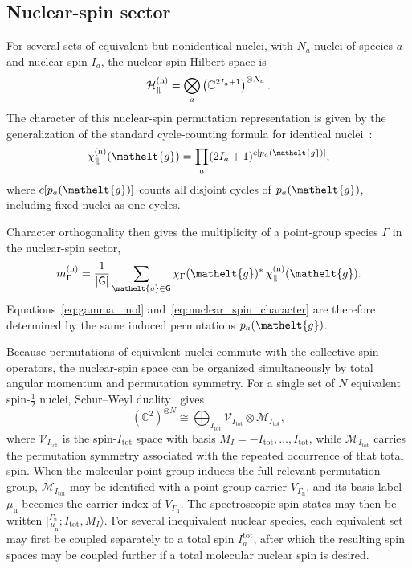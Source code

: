 \documentclass[
  reprint,
  aps,
  prx,
  superscriptaddress,
  amsmath,
  amssymb,
  longbibliography
]{revtex4-2}
\newcommand{\eltfont}[1]{{\let\sigma\eltsigma\mathelt{#1}}}
\newcommand{\grp}[1]{\mathsf{#1}}
\newcommand{\elt}[1]{\eltfont{#1}}
\newcommand{\cgket}[3]{\bigl\lvert{}^{#1}_{\,#2};#3\bigr\rangle}
\newcommand{\gel}{\elt{g}}             %
\newcommand{\spin}{\mathrel{\upharpoonleft}\kern-2pt\mathrel{\downharpoonright}}
\providecommand{\spin}{\mathrel{\upharpoonleft}\kern-2pt\mathrel{\downharpoonright}}
\providecommand{\Gspin}{\Gamma_{\mathrm{n}}}
\begin{document}
\subsection{Nuclear-spin sector}
\label{sec:spin_sector}

For several sets of equivalent but nonidentical nuclei, with \(N_a\) nuclei of species \(a\) and nuclear spin \(I_a\), the nuclear-spin Hilbert space is
\[
\mathcal H^{(\mathrm n)}_{\spin}
=
\bigotimes_a
\left(\mathbb C^{2I_a+1}\right)^{\otimes N_a}.
\]
The character of this nuclear-spin permutation representation is given by the generalization of the standard cycle-counting formula for identical nuclei~\cite{Oka2011}:
\begin{equation}
\chi^{(\mathrm n)}_{\spin}(\gel)
=
\prod_a
(2I_a+1)^{c[p_a(\gel)]},
\label{eq:nuclear_spin_character}
\end{equation}
where \(c[p_a(\gel)]\) counts all disjoint cycles of \(p_a(\gel)\), including fixed nuclei as one-cycles. 

Character orthogonality then gives the multiplicity of a point-group species \(\Gamma\) in the nuclear-spin sector,
\begin{equation}
m^{(\mathrm n)}_\Gamma
=
\frac{1}{|\grp{G}|}
\sum_{\gel\in\grp{G}}
\chi_\Gamma(\gel)^*\,
\chi^{(\mathrm n)}_{\spin}(\gel).
\label{eq:nuclear_spin_multiplicity}
\end{equation}
Equations~\eqref{eq:gamma_mol} and~\eqref{eq:nuclear_spin_character} are therefore determined by the same induced permutations \(p_a(\gel)\).



Because permutations of equivalent nuclei commute with the collective-spin operators, the nuclear-spin space can be organized simultaneously by total angular momentum and permutation symmetry. For a single set of \(N\) equivalent spin-\(\tfrac12\) nuclei, Schur--Weyl duality~\cite{Schmiedt2016} gives
\[
(\mathbb C^2)^{\otimes N}
\cong
\bigoplus_{I_{\mathrm{tot}}}
\mathcal V_{I_{\mathrm{tot}}}
\otimes
\mathcal M_{I_{\mathrm{tot}}},
\]
where \(\mathcal V_{I_{\mathrm{tot}}}\) is the spin-\(I_{\mathrm{tot}}\) space with basis \(M_I=-I_{\mathrm{tot}},\ldots,I_{\mathrm{tot}}\), while \(\mathcal M_{I_{\mathrm{tot}}}\) carries the permutation symmetry associated with the repeated occurrence of that total spin. When the molecular point group induces the full relevant permutation group, \(\mathcal M_{I_{\mathrm{tot}}}\) may be identified with a point-group carrier \(V_{\Gspin}\), and its basis label \(\mu_{\mathrm n}\) becomes the carrier index of \(V_{\Gspin}\). The spectroscopic spin states may then be written
\(
\cgket{\Gspin}{\mu_{\mathrm n}}{I_{\mathrm{tot}},M_I}.
\)
For several inequivalent nuclear species, each equivalent set may first be coupled separately to a total spin \(I_a^{\mathrm{tot}}\), after which the resulting spin spaces may be coupled further if a total molecular nuclear spin is desired.
\end{document}
